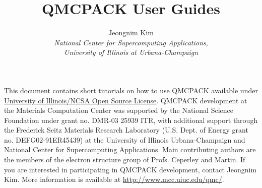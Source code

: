 \documentclass[11pt]{article}
\title{QMCPACK User Guides}
\author{Jeongnim Kim\\
\it National Center for Supercomputing Applications,\\
\it University of Illinois at Urbana-Champaign}
\begin{document}
\maketitle

This document contains short tutorials on how to use QMCPACK available under
\href{http://www.opensource.org/licenses/UoI-NCSA.php}{University of
Illinois/\-NCSA Open Source License}.  QMCPACK development at the Materials
Computation Center was supported by the National Science Foundation under grant
no. DMR-{}03 25939 ITR, with additional support through the Frederick Seitz
Materials Research Laboratory (U.S. Dept. of Energy grant no.
DEFG02-{}91ER45439) at the University of Illinois Urbana-{}Champaign and
National Center for Supercomputing Applications.  Main contributing authors are
the members of the electron structure group of Profs. Ceperley and Martin.  If
you are interested in participating in QMCPACK development, contact Jeongnim
Kim.  More information is available at \url{http://www.mcc.uiuc.edu/qmc/}.  

\tableofcontents
\newpage





%
\end{document}
